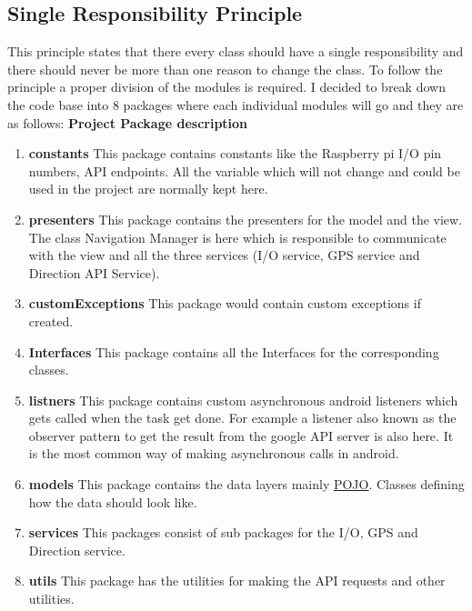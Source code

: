 \subsection{Single Responsibility Principle}
    This principle states that there every class should have a single responsibility
    and there should never be more than one reason to change the class. To
    follow the principle a proper division of the modules is required. 
    I decided to break down the code base into 8 packages where each 
    individual modules will go and they are as follows:
    \newpage
    \textbf{Project Package description}
    \begin{enumerate}
        \item 
            \textbf{constants} 
                This package contains constants like the Raspberry pi I/O pin 
                numbers, API endpoints. All the variable which will not 
                change and could be used in the project are normally kept here.
        \item 
            \textbf{presenters} 
                This package contains the presenters for the model and the view.
                The class Navigation Manager is here which is responsible to communicate
                with the view and all the three services (I/O service, GPS service and 
                Direction API Service).  
        \item 
            \textbf{customExceptions}
                This package would contain custom exceptions if created.
        \item 
            \textbf{Interfaces}
                This package contains all the Interfaces for the corresponding classes. 
        \item 
            \textbf{listners}
                This package contains custom asynchronous android listeners which gets 
                called when the task get done. For example a listener also known as the
                observer pattern \cite{Hotop2015} to get the result
                from the google API server is also here. It is the most common way of
                making asynchronous calls in android.
        \item 
            \textbf{models}
            This package contains the data layers mainly 
            \href{https://spring.io/understanding/POJO}  {POJO}. Classes defining how the
            data should look like.
        \item 
            \textbf{services} 
                This packages consist of sub packages for the I/O, GPS and Direction service.
        \item 
            \textbf{utils}
                This package has the utilities for making the API requests and other utilities. 
    \end{enumerate}

